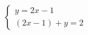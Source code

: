 $\displaystyle
\left\{
\begin{array}{l}
\displaystyle y = 2x - 1 \\
\displaystyle (2x - 1) + y = 2
\end{array}
\right.
$
